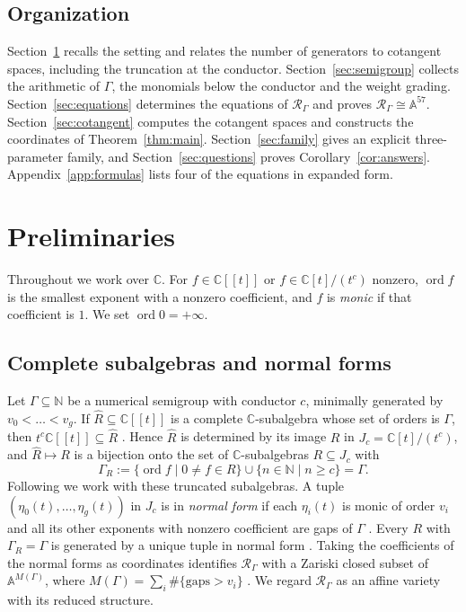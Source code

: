 \documentclass{amsart}
\theoremstyle{definition}
\theoremstyle{remark}
\numberwithin{equation}{section}
\newcommand{\CC}{\mathbb{C}}
\newcommand{\NN}{\mathbb{N}}
\newcommand{\AF}{\mathbb{A}}
\newcommand{\Rs}{\mathcal{R}_\Gamma}
\newcommand{\ps}{[\![t]\!]}
\DeclareMathOperator{\ord}{ord}
\begin{document}
\subsection*{Organization}
Section~\ref{sec:prelim} recalls the setting and relates the number of generators to cotangent spaces, including the truncation at the conductor. Section~\ref{sec:semigroup} collects the arithmetic of $\Gamma$, the monomials below the conductor and the weight grading. Section~\ref{sec:equations} determines the equations of $\Rs$ and proves $\Rs\cong\AF^{57}$. Section~\ref{sec:cotangent} computes the cotangent spaces and constructs the coordinates of Theorem~\ref{thm:main}. Section~\ref{sec:family} gives an explicit three-parameter family, and Section~\ref{sec:questions} proves Corollary~\ref{cor:answers}. Appendix~\ref{app:formulas} lists four of the equations in expanded form.

\section{Preliminaries}\label{sec:prelim}

Throughout we work over $\CC$. For $f\in\CC\ps$ or $f\in\CC[t]/(t^c)$ nonzero, $\ord f$ is the smallest exponent with a nonzero coefficient, and $f$ is \emph{monic} if that coefficient is $1$. We set $\ord 0=+\infty$.

\subsection{Complete subalgebras and normal forms}
Let $\Gamma\subseteq\NN$ be a numerical semigroup with conductor $c$, minimally generated by $v_0<\dots<v_g$. If $\widehat R\subseteq\CC\ps$ is a complete $\CC$-subalgebra whose set of orders is $\Gamma$, then $t^c\CC\ps\subseteq\widehat R$ \cite[Proposition~2.1]{Ham20}. Hence $\widehat R$ is determined by its image $R$ in $J_c=\CC[t]/(t^c)$, and $\widehat R\mapsto R$ is a bijection onto the set of $\CC$-subalgebras $R\subseteq J_c$ with
\[
\Gamma_R:=\{\ord f\mid 0\neq f\in R\}\cup\{n\in\NN\mid n\ge c\}=\Gamma.
\]
Following \cite[Section~2]{Ham20} we work with these truncated subalgebras. A tuple $(\eta_0(t),\dots,\eta_g(t))$ in $J_c$ is in \emph{normal form} if each $\eta_i(t)$ is monic of order $v_i$ and all its other exponents with nonzero coefficient are gaps of $\Gamma$ \cite[Definition~2.2]{Ham20}. Every $R$ with $\Gamma_R=\Gamma$ is generated by a unique tuple in normal form \cite[Proposition~2.4]{Ham20}. Taking the coefficients of the normal forms as coordinates identifies $\Rs$ with a Zariski closed subset of $\AF^{M(\Gamma)}$, where $M(\Gamma)=\sum_i\#\{\text{gaps}>v_i\}$ \cite[Theorem~2.22]{Ham20}. We regard $\Rs$ as an affine variety with its reduced structure.
\end{document}

